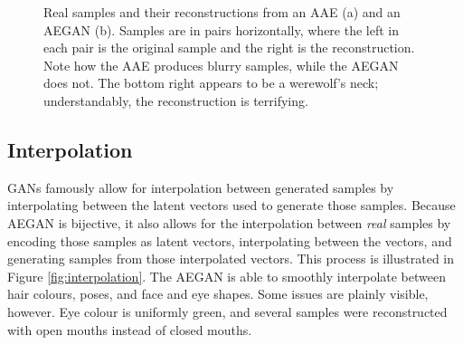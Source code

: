 \documentclass{article}
\begin{document}
\begin{figure}[t]%
    \centering
    \qquad
    \caption{Real samples and their reconstructions from an AAE (a) and an AEGAN (b). Samples are in pairs horizontally, where the left in each pair is the original sample and the right is the reconstruction. Note how the AAE produces blurry samples, while the AEGAN does not. The bottom right appears to be a werewolf's neck; understandably, the reconstruction is terrifying.}%
    \label{fig:reconstructed}%
\end{figure}

\subsection{Interpolation}
GANs famously allow for interpolation between generated samples by interpolating between the latent vectors used to generate those samples. Because AEGAN is bijective, it also allows for the interpolation between \textit{real} samples by encoding those samples as latent vectors, interpolating between the vectors, and generating samples from those interpolated vectors. This process is illustrated in Figure \ref{fig:interpolation}. The AEGAN is able to smoothly interpolate between hair colours, poses, and face and eye shapes. Some issues are plainly visible, however. Eye colour is uniformly green, and several samples were reconstructed with open mouths instead of closed mouths. 
\end{document}
